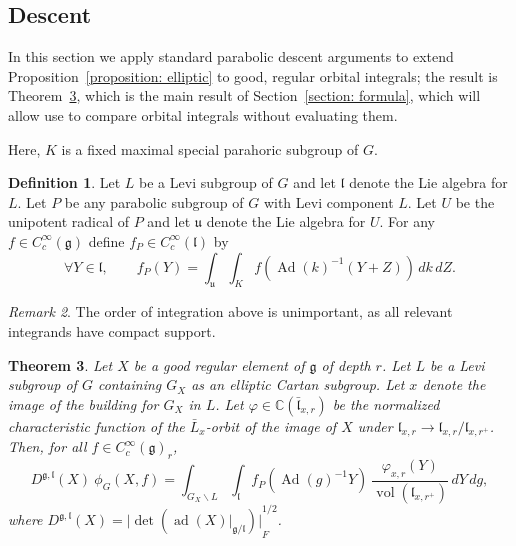 \documentclass[11pt]{amsart}
\newtheorem{theorem}{Theorem}[section]
\theoremstyle{definition}
\newtheorem{definition}[theorem]{Definition}
\theoremstyle{remark}
\newtheorem{remark}[theorem]{Remark}
\numberwithin{equation}{theorem}
\def\C{{\mathbb{C}}}
\def\F{{F}}
\def\GF{{G}}
\def\LF{{L}}
\def\UF{{U}}
\def\PF{{P}}
\def\lF{{\mathfrak{l}}}
\def\uF{{\mathfrak{u}}}
\def\gF{{\mathfrak{g}}}
\def\orbint{{\phi}}
\def\vphi{{\varphi}}
\def\Sch#1{{C^\infty_c(#1)}}
\def\Ad{{\rm Ad}}
\def\leftcoset{{\backslash}}
\def\vol{{\operatorname{vol}}}
\def\ad{{\rm ad}}
\def\abs#1{{\vert #1\vert}}
\def\vol{\operatorname{vol}}
\def\Ad{\operatorname{Ad}}
\def\ad{\operatorname{ad}}
\begin{document}


\subsection{Descent}\label{section: descent}

In this section we apply standard parabolic descent arguments to
extend Proposition~\ref{proposition: elliptic} to good, regular
orbital integrals; the result is Theorem~\ref{theorem: main},
which is the main result of Section~\ref{section: formula}, which
will allow use to compare orbital integrals without evaluating
them.

Here, $K$ is a fixed maximal special parahoric subgroup of $\GF$.

\begin{definition}\label{definition: Jacquet}
Let $\LF$ be a Levi subgroup of $\GF$ and let $\lF$ denote the Lie
algebra for $\LF$. Let $\PF$ be any parabolic subgroup of $\GF$
with Levi component $\LF$. Let $\UF$ be the unipotent radical of
$\PF$ and let $\uF$ denote the Lie algebra for $\UF$. For any
$f\in \Sch{\gF}$ define $f_\PF \in \Sch{\lF}$ by
\begin{equation}
    \forall Y \in \lF,\qquad f_\PF(Y) = \int_{\uF} \int_K
    f(\Ad(k)^{-1}(Y+Z))\, dk\, dZ.
\end{equation}
\end{definition}

\begin{remark}
The order of integration above is unimportant, as all relevant
integrands have compact support.
\end{remark}




\begin{theorem}\label{theorem: main}
Let $X$ be a good regular element of $\gF$ of depth $r$. Let $\LF$
be a Levi subgroup of $\GF$ containing $\GF_X$ as an elliptic
Cartan subgroup. Let $x$ denote the image of the building for
$\GF_X$ in $\LF$. Let $\vphi \in \C(\bar{\lF}_{x,r})$ be the
normalized characteristic function of the $\bar{\LF}_x$-orbit of
the image of $X$ under $\lF_{x,r} \to \lF_{x,r}/\lF_{x,r^+}$.
Then, for all  $f\in \Sch{\gF}_r$,
\begin{equation}
D^{\gF,\lF}(X)\
\orbint_\GF(X,f) = \int_{\GF_X\leftcoset\LF} \int_{\lF}
f_\PF(\Ad(g)^{-1}Y)\ \frac{\vphi_{x,r}(Y)}{\vol(\lF_{x,r^+})} \,
dY\, dg,
\end{equation}
where $D^{\gF,\lF}(X) =
\abs{\det(\ad(X)\vert_{\gF/\lF})}_\F^{1/2}$.
\end{theorem}
\end{document}
